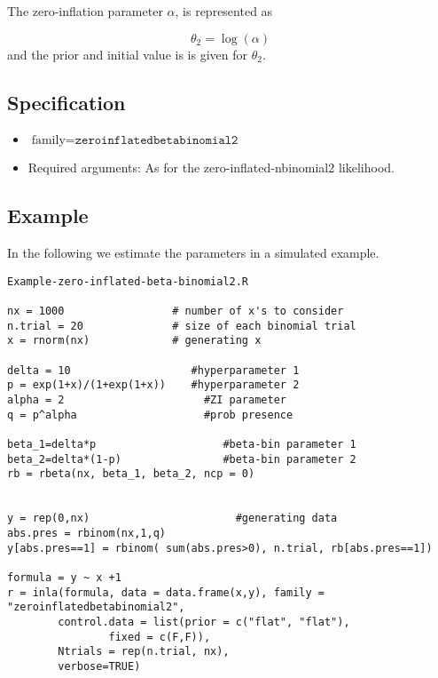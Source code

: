 \documentclass[a4paper,11pt]{article}
\begin{document}
\vspace{5mm}

\noindent
The zero-inflation parameter $\alpha$, is represented as

\begin{displaymath}
    \theta_2 = \log(\alpha)
\end{displaymath}
and the prior and initial value is is given for $\theta_{2}$.

\subsection*{Specification}

\begin{itemize}
\item $\text{family}=\texttt{zeroinflatedbetabinomial2}$
\item Required arguments: As for the zero-inflated-nbinomial2
    likelihood.
\end{itemize}

\subsection*{Example}

In the following we estimate the parameters in a simulated example.

\begin{verbatim}
Example-zero-inflated-beta-binomial2.R

nx = 1000                 # number of x's to consider
n.trial = 20              # size of each binomial trial
x = rnorm(nx)             # generating x

delta = 10                   #hyperparameter 1
p = exp(1+x)/(1+exp(1+x))    #hyperparameter 2
alpha = 2                      #ZI parameter
q = p^alpha                    #prob presence

beta_1=delta*p                    #beta-bin parameter 1
beta_2=delta*(1-p)                #beta-bin parameter 2                                 
rb = rbeta(nx, beta_1, beta_2, ncp = 0)

        
y = rep(0,nx)                       #generating data                    
abs.pres = rbinom(nx,1,q)
y[abs.pres==1] = rbinom( sum(abs.pres>0), n.trial, rb[abs.pres==1])

formula = y ~ x +1
r = inla(formula, data = data.frame(x,y), family = "zeroinflatedbetabinomial2",
        control.data = list(prior = c("flat", "flat"),
                fixed = c(F,F)),
        Ntrials = rep(n.trial, nx),
        verbose=TRUE)
\end{verbatim}
\end{document}
